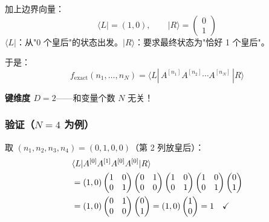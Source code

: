 \documentclass[12pt,a4paper]{ctexart}
\begin{document}
加上边界向量：
\begin{equation}
\langle L| = (1, 0), \qquad |R\rangle = \begin{pmatrix} 0 \\ 1 \end{pmatrix}
\end{equation}
$\langle L|$：从"0 个皇后"的状态出发。$|R\rangle$：要求最终状态为"恰好 1 个皇后"。

于是：
\begin{equation}
\boxed{
f_{\text{exact}}(n_1, \ldots, n_N) = \langle L| \, A^{[n_1]} A^{[n_2]} \cdots A^{[n_N]} \, |R\rangle
}
\end{equation}

\textbf{键维度 $D = 2$}——和变量个数 $N$ 无关！

\subsubsection*{验证（$N=4$ 为例）}

取 $(n_1, n_2, n_3, n_4) = (0, 1, 0, 0)$（第 2 列放皇后）：
\begin{align}
&\langle L| A^{[0]} A^{[1]} A^{[0]} A^{[0]} |R\rangle \notag \\
&= (1,0) \begin{pmatrix}1&0\\0&1\end{pmatrix} \begin{pmatrix}0&1\\0&0\end{pmatrix} \begin{pmatrix}1&0\\0&1\end{pmatrix} \begin{pmatrix}1&0\\0&1\end{pmatrix} \begin{pmatrix}0\\1\end{pmatrix} \notag \\
&= (1,0) \begin{pmatrix}0&1\\0&0\end{pmatrix} \begin{pmatrix}0\\1\end{pmatrix} = (1,0) \begin{pmatrix}1\\0\end{pmatrix} = 1 \quad \checkmark
\end{align}
\end{document}
